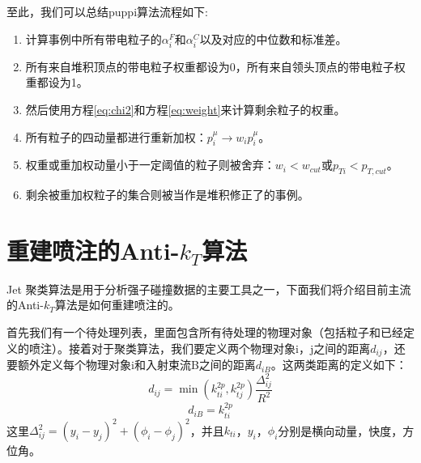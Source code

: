 至此，我们可以总结puppi算法流程如下:
\begin{enumerate}
    \item 计算事例中所有带电粒子的$\alpha^F_i$和$\alpha^C_i$以及对应的中位数和标准差。
    \item 所有来自堆积顶点的带电粒子权重都设为0，所有来自领头顶点的带电粒子权重都设为1。
    \item 然后使用方程\eqref{eq:chi2}和方程\eqref{eq:weight}来计算剩余粒子的权重。
    \item 所有粒子的四动量都进行重新加权：$p_i^\mu\to w_ip_i^\mu$。
    \item 权重或重加权动量小于一定阈值的粒子则被舍弃：$w_i<w_{cut}$或$p_{Ti}<p_{T,cut}$。
    \item 剩余被重加权粒子的集合则被当作是堆积修正了的事例。
\end{enumerate}

\section{重建喷注的Anti-$k_T$算法}
Jet 聚类算法是用于分析强子碰撞数据的主要工具之一，下面我们将介绍目前主流的Anti-$k_T$算法\cite{The_anti-kt_jet_clustering_algorithm}是如何重建喷注的。

首先我们有一个待处理列表，里面包含所有待处理的物理对象（包括粒子和已经定义的喷注）。接着对于聚类算法，我们要定义两个物理对象i，j之间的距离\(d_{ij}\)，还要额外定义每个物理对象i和入射束流B之间的距离$d_{iB}$。这两类距离的定义如下：
\begin{equation}\label{eq:dij}
    d_{ij}=\min(k_{ti}^{2p},k_{tj}^{2p})\frac{\Delta_{ij}^{2}}{R^{2}}
\end{equation}
\begin{equation}\label{eq:diB}
    d_{iB}=k_{ti}^{2p}
\end{equation}
这里$\displaystyle\Delta_{ij}^{2}=(y_{i}-y_{j})^{2}+(\phi_{i}-\phi_{j})^{2}$，并且$k_{ti}$，$y_i$，$\phi_i$分别是横向动量，快度，方位角。%

